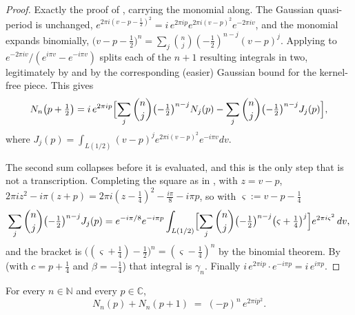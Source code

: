 \begin{proof}
Exactly the proof of , carrying the monomial along.  The Gaussian
quasi-period is unchanged,
$e^{2\pi i(v-p-\frac12)^{2}}=i\,e^{2\pi ip}e^{2\pi i(v-p)^{2}}e^{-2\pi iv}$, and the monomial
expands binomially, $\bigl(v-p-\tfrac12\bigr)^{n}
=\sum_{j}\binom nj(-\tfrac12)^{n-j}(v-p)^{j}$.  Applying  to
$e^{-2\pi iv}/(e^{i\pi v}-e^{-i\pi v})$ splits each of the $n+1$ resulting integrals in two,
legitimately by  and by the corresponding (easier) Gaussian bound for
the kernel-free piece.  This gives
\[
  N_{n}\bigl(p+\tfrac12\bigr)=i\,e^{2\pi ip}\Bigl[\sum_{j}\binom nj\bigl(-\tfrac12\bigr)^{n-j}N_{j}(p)
     -\sum_{j}\binom nj\bigl(-\tfrac12\bigr)^{n-j}J_{j}(p)\Bigr],
\]
where $J_{j}(p)=\int_{L(1/2)}(v-p)^{j}e^{2\pi i(v-p)^{2}}e^{-i\pi v}dv$.

The second sum collapses before it is evaluated, and this is the only step that is not a
transcription.  Completing the square as in , with $z=v-p$,
$2\pi iz^{2}-i\pi(z+p)=2\pi i(z-\tfrac14)^{2}-\tfrac{i\pi}8-i\pi p$, so with
$\varsigma:=v-p-\tfrac14$
\[
  \sum_{j}\binom nj\bigl(-\tfrac12\bigr)^{n-j}J_{j}(p)
  =e^{-i\pi/8}e^{-i\pi p}\int_{L(1/2)}
    \Bigl[\sum_{j}\binom nj\bigl(-\tfrac12\bigr)^{n-j}\bigl(\varsigma+\tfrac14\bigr)^{j}\Bigr]
    e^{2\pi i\varsigma^{2}}\,dv ,
\]
and the bracket is $\bigl((\varsigma+\tfrac14)-\tfrac12\bigr)^{n}=(\varsigma-\tfrac14)^{n}$ by
the binomial theorem.  By  (with $c=p+\tfrac14$ and $\beta=-\tfrac14$) that
integral is $\gamma_{n}$.  Finally $i\,e^{2\pi ip}\cdot e^{-i\pi p}=i\,e^{i\pi p}$.
\end{proof}

\begin{lemma}
\label{lem:rsg_unit_shift}
For every $n\in\mathbb{N}$ and every $p\in\mathbb{C}$,
\[
  N_{n}(p)+N_{n}(p+1)\;=\;(-p)^{n}\,e^{2\pi ip^{2}} .
\]
\end{lemma}

